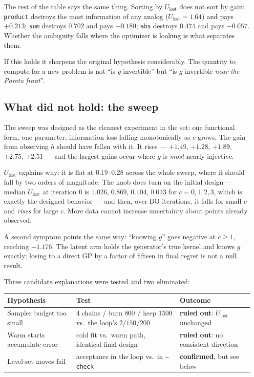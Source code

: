 \documentclass[11pt]{article}
\newcommand{\Ulost}{U_{\text{lost}}}
\begin{document}
The rest of the table says the same thing. Sorting by $\Ulost$ does not sort by
gain: \texttt{product} destroys the most information of any analog
($\Ulost=1.64$) and pays $+0.213$; \texttt{sum} destroys $0.702$ and pays
$-0.180$; \texttt{abs} destroys $0.474$ and pays $-0.057$. Whether the ambiguity
falls where the optimizer is looking is what separates them.

If this holds it sharpens the original hypothesis considerably. The quantity to
compute for a new problem is not ``is $g$ invertible'' but ``is $g$ invertible
\emph{near the Pareto front}''.

\subsection{What did not hold: the sweep}
\label{sec:sweepanomaly}

The sweep was designed as the cleanest experiment in the set: one functional
form, one parameter, information loss falling monotonically as $c$ grows. The
gain from observing $h$ should have fallen with it. It rises --- $+1.49$,
$+1.28$, $+1.89$, $+2.75$, $+2.51$ --- and the largest gains occur where $g$ is
\emph{most} nearly injective.

$\Ulost$ explains why: it is flat at $0.19$--$0.28$ across the whole sweep,
where it should fall by two orders of magnitude. The knob does turn on the
initial design --- median $\Ulost$ at iteration $0$ is $1.026$, $0.869$,
$0.104$, $0.013$ for $c=0,1,2,3$, which is exactly the designed behavior --- and
then, over BO iterations, it falls for small $c$ and \emph{rises} for large $c$.
More data cannot increase uncertainty about points already observed.

A second symptom points the same way: ``knowing $g$'' goes negative at $c\ge1$,
reaching $-1.176$. The latent arm holds the generator's true kernel and knows
$g$ exactly; losing to a direct GP by a factor of fifteen in final regret is not
a null result.

Three candidate explanations were tested and two eliminated:

\begin{center}
\begin{tabular}{lll}
\toprule
Hypothesis & Test & Outcome \\
\midrule
Sampler budget too small & $4$ chains / burn $800$ / keep $1500$ vs.\ the loop's
$2/150/200$ & \textbf{ruled out}: $\Ulost$ unchanged \\
Warm starts accumulate error & cold fit vs.\ warm path, identical final design &
\textbf{ruled out}: no consistent direction \\
Level-set moves fail & acceptance in the loop vs.\ in \texttt{--check} &
\textbf{confirmed}, but see below \\
\bottomrule
\end{tabular}
\end{center}
\end{document}
